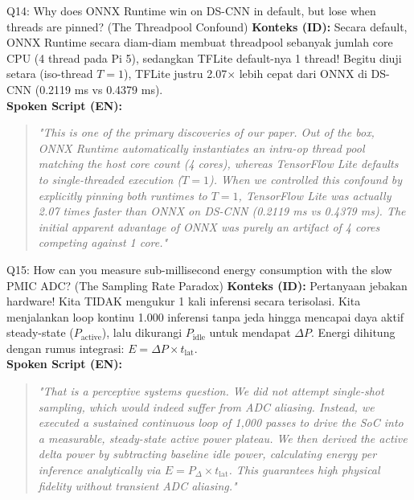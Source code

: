 \documentclass[11pt,a4paper]{article}
\begin{document}
\begin{hardbox}{Q14: Why does ONNX Runtime win on DS-CNN in default, but lose when threads are pinned? (The Threadpool Confound)}
\textbf{Konteks (ID):} Secara default, ONNX Runtime secara diam-diam membuat threadpool sebanyak jumlah core CPU (4 thread pada Pi 5), sedangkan TFLite default-nya 1 thread! Begitu diuji setara (iso-thread $T=1$), TFLite justru 2.07$\times$ lebih cepat dari ONNX di DS-CNN (0.2119 ms vs 0.4379 ms).\\
\textbf{Spoken Script (EN):}
\begin{quote}
\small
\textit{"This is one of the primary discoveries of our paper. Out of the box, ONNX Runtime automatically instantiates an intra-op thread pool matching the host core count (4 cores), whereas TensorFlow Lite defaults to single-threaded execution ($T=1$). When we controlled this confound by explicitly pinning both runtimes to $T=1$, TensorFlow Lite was actually 2.07 times faster than ONNX on DS-CNN (0.2119 ms vs 0.4379 ms). The initial apparent advantage of ONNX was purely an artifact of 4 cores competing against 1 core."}
\end{quote}
\end{hardbox}

\begin{hardbox}{Q15: How can you measure sub-millisecond energy consumption with the slow PMIC ADC? (The Sampling Rate Paradox)}
\textbf{Konteks (ID):} Pertanyaan jebakan hardware! Kita TIDAK mengukur 1 kali inferensi secara terisolasi. Kita menjalankan loop kontinu 1.000 inferensi tanpa jeda hingga mencapai daya aktif steady-state ($P_{\text{active}}$), lalu dikurangi $P_{\text{idle}}$ untuk mendapat $\Delta P$. Energi dihitung dengan rumus integrasi: $E = \Delta P \times t_{\text{lat}}$.\\
\textbf{Spoken Script (EN):}
\begin{quote}
\small
\textit{"That is a perceptive systems question. We did not attempt single-shot sampling, which would indeed suffer from ADC aliasing. Instead, we executed a sustained continuous loop of 1,000 passes to drive the SoC into a measurable, steady-state active power plateau. We then derived the active delta power by subtracting baseline idle power, calculating energy per inference analytically via $E = P_\Delta \times t_\text{lat}$. This guarantees high physical fidelity without transient ADC aliasing."}
\end{quote}
\end{hardbox}
\end{document}
